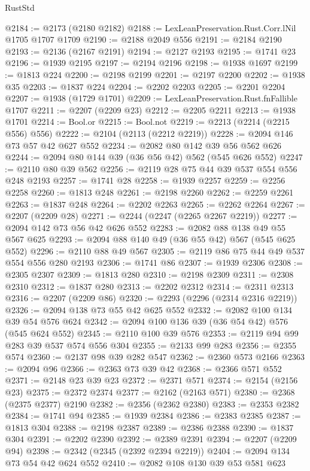 \begin{lexlean}{RustStd}
\begin{coremodule}
@2184 := @2173 (@2180 @2182)
@2188 := LexLeanPreservation.Rust.Corr.lNil @1705 @1707 @1709
@2190 := @2188 @2049 @556
@2191 := @2184 @2190
@2193 := @2136 (@2167 @2191)
@2194 := @2127 @2193
@2195 := @1741 @23
@2196 := @1939 @2195
@2197 := @2194 @2196
@2198 := @1938 @1697
@2199 := @1813 @224
@2200 := @2198 @2199
@2201 := @2197 @2200
@2202 := @1938 @35
@2203 := @1837 @224
@2204 := @2202 @2203
@2205 := @2201 @2204
@2207 := @1938 (@1729 @1701)
@2209 := LexLeanPreservation.Rust.fnFallible @1707
@2211 := @2207 (@2209 @23)
@2212 := @2205 @2211
@2213 := @1938 @1701
@2214 := Bool.or
@2215 := Bool.not
@2219 := @2213 (@2214 (@2215 @556) @556)
@2222 := @2104 (@2113 (@2212 @2219))
@2228 := @2094 @146 @73 @57 @42 @627 @552
@2234 := @2082 @80 @142 @39 @56 @562 @626
@2244 := @2094 @80 @144 @39 (@36 @56 @42) @562 (@545 @626 @552)
@2247 := @2110 @80 @39 @562
@2256 := @2119 @28 @75 @44 @39 @537 @554 @556 @248 @2193
@2257 := @1741 @28
@2258 := @1939 @2257
@2259 := @2256 @2258
@2260 := @1813 @248
@2261 := @2198 @2260
@2262 := @2259 @2261
@2263 := @1837 @248
@2264 := @2202 @2263
@2265 := @2262 @2264
@2267 := @2207 (@2209 @28)
@2271 := @2244 (@2247 (@2265 @2267 @2219))
@2277 := @2094 @142 @73 @56 @42 @626 @552
@2283 := @2082 @88 @138 @49 @55 @567 @625
@2293 := @2094 @88 @140 @49 (@36 @55 @42) @567 (@545 @625 @552)
@2296 := @2110 @88 @49 @567
@2305 := @2119 @86 @75 @44 @49 @537 @554 @556 @280 @2193
@2306 := @1741 @86
@2307 := @1939 @2306
@2308 := @2305 @2307
@2309 := @1813 @280
@2310 := @2198 @2309
@2311 := @2308 @2310
@2312 := @1837 @280
@2313 := @2202 @2312
@2314 := @2311 @2313
@2316 := @2207 (@2209 @86)
@2320 := @2293 (@2296 (@2314 @2316 @2219))
@2326 := @2094 @138 @73 @55 @42 @625 @552
@2332 := @2082 @100 @134 @39 @54 @576 @624
@2342 := @2094 @100 @136 @39 (@36 @54 @42) @576 (@545 @624 @552)
@2345 := @2110 @100 @39 @576
@2353 := @2119 @94 @99 @283 @39 @537 @574 @556 @304
@2355 := @2133 @99 @283
@2356 := @2355 @574
@2360 := @2137 @98 @39 @282 @547
@2362 := @2360 @573 @2166
@2363 := @2094 @96
@2366 := @2363 @73 @39 @42
@2368 := @2366 @571 @552
@2371 := @2148 @23 @39 @23
@2372 := @2371 @571
@2374 := @2154 (@2156 @23)
@2375 := @2372 @2374
@2377 := @2162 (@2163 @571)
@2380 := @2368 (@2375 @2377) @2190
@2382 := @2356 (@2362 @2380)
@2383 := @2353 @2382
@2384 := @1741 @94
@2385 := @1939 @2384
@2386 := @2383 @2385
@2387 := @1813 @304
@2388 := @2198 @2387
@2389 := @2386 @2388
@2390 := @1837 @304
@2391 := @2202 @2390
@2392 := @2389 @2391
@2394 := @2207 (@2209 @94)
@2398 := @2342 (@2345 (@2392 @2394 @2219))
@2404 := @2094 @134 @73 @54 @42 @624 @552
@2410 := @2082 @108 @130 @39 @53 @581 @623

\end{coremodule}
\end{lexlean}
